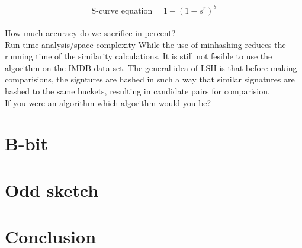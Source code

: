 \documentclass[a4paper,11pt]{article}
\begin{document}
\begin{equation}
\text {S-curve equation} = 1 - (1 - s^r)^b 
\end{equation}\\

How much accuracy do we sacrifice in percent?\\

Run time analysis/space complexity
While the use of minhashing reduces the running time of the similarity calculations. It is still not fesible to use the algorithm on the IMDB data set. The general idea of LSH is that before making comparisions, the signtures are hashed in such a way that similar signatures are hashed to the same buckets, resulting in candidate pairs for comparision.\\

If you were an algorithm which algorithm would you be?

\section{B-bit}

\section{Odd sketch}

\section{Conclusion}
\end{document}

